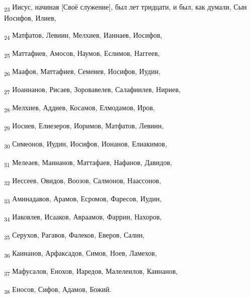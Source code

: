 \begin{tcolorbox}
\textsubscript{23} Иисус, начиная [Своё служение], был лет тридцати, и был, как думали, Сын Иосифов, Илиев,
\end{tcolorbox}
\begin{tcolorbox}
\textsubscript{24} Матфатов, Левиин, Мелхиев, Ианнаев, Иосифов,
\end{tcolorbox}
\begin{tcolorbox}
\textsubscript{25} Маттафиев, Амосов, Наумов, Еслимов, Наггеев,
\end{tcolorbox}
\begin{tcolorbox}
\textsubscript{26} Маафов, Маттафиев, Семеиев, Иосифов, Иудин,
\end{tcolorbox}
\begin{tcolorbox}
\textsubscript{27} Иоаннанов, Рисаев, Зоровавелев, Салафиилев, Нириев,
\end{tcolorbox}
\begin{tcolorbox}
\textsubscript{28} Мелхиев, Аддиев, Косамов, Елмодамов, Иров,
\end{tcolorbox}
\begin{tcolorbox}
\textsubscript{29} Иосиев, Елиезеров, Иоримов, Матфатов, Левиин,
\end{tcolorbox}
\begin{tcolorbox}
\textsubscript{30} Симеонов, Иудин, Иосифов, Ионанов, Елиакимов,
\end{tcolorbox}
\begin{tcolorbox}
\textsubscript{31} Мелеаев, Маинанов, Маттафаев, Нафанов, Давидов,
\end{tcolorbox}
\begin{tcolorbox}
\textsubscript{32} Иессеев, Овидов, Воозов, Салмонов, Наассонов,
\end{tcolorbox}
\begin{tcolorbox}
\textsubscript{33} Аминадавов, Арамов, Есромов, Фаресов, Иудин,
\end{tcolorbox}
\begin{tcolorbox}
\textsubscript{34} Иаковлев, Исааков, Авраамов, Фаррин, Нахоров,
\end{tcolorbox}
\begin{tcolorbox}
\textsubscript{35} Серухов, Рагавов, Фалеков, Еверов, Салин,
\end{tcolorbox}
\begin{tcolorbox}
\textsubscript{36} Каинанов, Арфаксадов, Симов, Ноев, Ламехов,
\end{tcolorbox}
\begin{tcolorbox}
\textsubscript{37} Мафусалов, Енохов, Иаредов, Малелеилов, Каинанов,
\end{tcolorbox}
\begin{tcolorbox}
\textsubscript{38} Еносов, Сифов, Адамов, Божий.
\end{tcolorbox}
